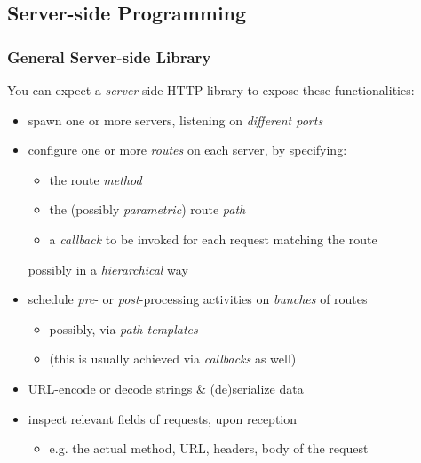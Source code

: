 \documentclass[presentation]{beamer}\mode<presentation>{\usetheme{AMSBolognaFC}}
\begin{document}
\subsection{Server-side Programming}

\begin{frame}%
\frametitle{General Server-side Library}

    You can expect a \emph{server}-side HTTP library to expose these functionalities:
    \begin{itemize}
        \item spawn one or more servers, listening on \emph{different ports}

        \vfill

        \item configure one or more \emph{routes} on each server, by specifying:
        \begin{itemize}
            \item the route \emph{method}
            \item the (possibly \emph{parametric}) route \emph{path}
            \item a \emph{callback} to be invoked for each request matching the route
        \end{itemize}
        possibly in a \emph{hierarchical} way

        \vfill

        \item schedule \emph{pre}- or \emph{post}-processing activities on \emph{bunches} of routes
        \begin{itemize}
            \item possibly, via \emph{path templates}
            \item (this is usually achieved via \emph{callbacks} as well)
        \end{itemize}

        \vfill

        \item URL-encode or decode strings \& (de)serialize data

        \vfill

        \item inspect relevant fields of requests, upon reception
        \begin{itemize}
            \item e.g. the actual method, URL, headers, body of the request
        \end{itemize}


\end{itemize}
\end{frame}
\end{document}
